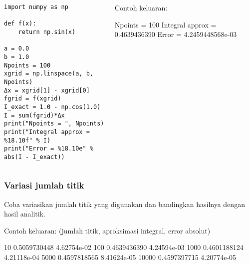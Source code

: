 \begin{frame}[fragile]

\begin{columns}

\begin{column}{0.5\textwidth}
\begin{verbatim}
import numpy as np
    
def f(x):
    return np.sin(x)
  
a = 0.0
b = 1.0  
Npoints = 100
xgrid = np.linspace(a, b, Npoints)
Δx = xgrid[1] - xgrid[0]
fgrid = f(xgrid)
I_exact = 1.0 - np.cos(1.0)
I = sum(fgrid)*Δx
print("Npoints = ", Npoints)
print("Integral approx = %18.10f" % I)
print("Error = %18.10e" % abs(I - I_exact))  
\end{verbatim}
\end{column}

\begin{column}{0.5\textwidth}
Contoh keluaran:
\begin{textcode}
Npoints =  100
Integral approx = 0.4639436390
Error = 4.2459448568e-03
\end{textcode}
\end{column}

\end{columns}

\end{frame}


\begin{frame}[fragile]
\frametitle{Variasi jumlah titik}

Coba variasikan jumlah titik yang digunakan dan bandingkan hasilnya dengan
hasil analitik.

Contoh keluaran: (jumlah titik, aproksimasi integral, error absolut)
\begin{textcode}
   10    0.5059730448 4.62754e-02
  100    0.4639436390 4.24594e-03
 1000    0.4601188124 4.21118e-04
 5000    0.4597818565 8.41624e-05
10000    0.4597397715 4.20774e-05
\end{textcode}

\end{frame}



